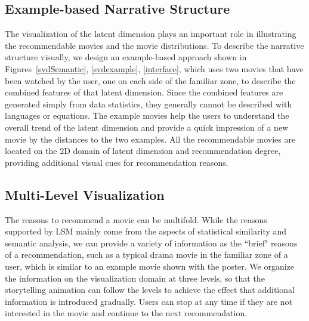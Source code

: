 \documentclass{vgtc}                          %
\begin{document}



\subsection{Example-based Narrative Structure}

The visualization of the latent dimension plays an important role in illustrating the recommendable movies and the movie distributions.
To describe the narrative structure visually, we design an example-based approach shown in Figures~\ref{svdSemantic}, \ref{svdexample}, \ref{interface}, which uses two movies that have been watched by the user, one on each side of the familiar zone, to describe the combined features of that latent dimension.
Since the combined features are generated simply from data statistics, they generally cannot be described with languages or equations.
The example movies help the users to understand the overall trend of the latent dimension and provide a quick impression of a new movie by the distances to the two examples.
All the recommendable movies are located on the 2D domain of latent dimension and recommendation degree, providing additional visual cues for recommendation reasons.


\subsection{Multi-Level Visualization}

The reasons to recommend a movie can be multifold. 
While the reasons supported by LSM mainly come from the aspects of statistical similarity and semantic analysis, we can provide a variety of information as the ``brief" reasons of a recommendation, such as a typical drama movie in the familiar zone of a user, which is similar to an example movie shown with the poster.
We organize the information on the visualization domain at three levels, so that the storytelling animation can follow the levels to achieve the effect that additional information is introduced gradually.
Users can stop at any time if they are not interested in the movie and continue to the next recommendation.
\end{document}
